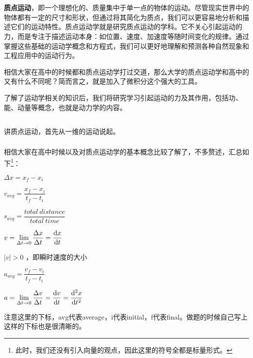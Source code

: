 \chapter[质点运动学与动力学基础]{}
\textbf{质点运动}，即一个理想化的、质量集中于单一点的物体的运动。尽管现实世界中的物体都有一定的尺寸和形状，但通过将其简化为质点，我们可以更容易地分析和描述它们的运动特性。质点运动学就是研究质点运动的学科。它不关心引起运动的力，而是专注于描述运动本身：如位置、速度、加速度等随时间变化的规律。通过掌握这些基础的运动学概念和方程式，我们可以更好地理解和预测各种自然现象和工程应用中的运动行为。

相信大家在高中的时候都和质点运动学打过交道，那么大学的质点运动学和高中的又有什么不同呢？简而言之，就是加入了微积分这个强大的工具。

了解了运动学相关的知识后，我们将研究学习引起运动的力及其作用，包括功、能、动量等概念，也就是动力学的内容。
\section[一维运动]{}
讲质点运动，首先从一维的运动说起。
\subsection[质点运动学的基本概念]{}
相信大家在高中时候以及对质点运动学的基本概念比较了解了，不多赘述，汇总如下\footnote{此时，我们还没有引入向量的观点，因此这里的符号全都是标量形式。}：
\begin{Itemize}
    \item {} $\Delta x=x_{f} -x_{i}$
    \item {} $v_{avg} =\dfrac{x_{f}-x_{i}  }{t_{f}-t_{i}  } $
    \item {} $s_{avg} =\dfrac{total\ distance}{total\ time} $
    \item {} $\displaystyle v=\lim_{\Delta t \to 0} \frac{\Delta x}{\Delta t} =\frac{\dif  x}{\dif  t} $
\end{Itemize}
\begin{Itemize}
    \item {} $\left | v \right | >0$ ，即瞬时速度的大小
    \item {} $a_{avg} =\dfrac{v_{f}-v_{i}  }{t_{f}-t_{i}  } $
    \item {} $\displaystyle a=\lim_{\Delta t \to 0} \frac{\Delta v}{\Delta t} =\frac{\dif  v}{\dif  t} = \frac{\dif ^2x}{\dif  t^2} $
\end{Itemize}
注意这里的下标，avg代表average，i代表initial，f代表final。做题的时候自己写上这样的下标也是很清晰的。
